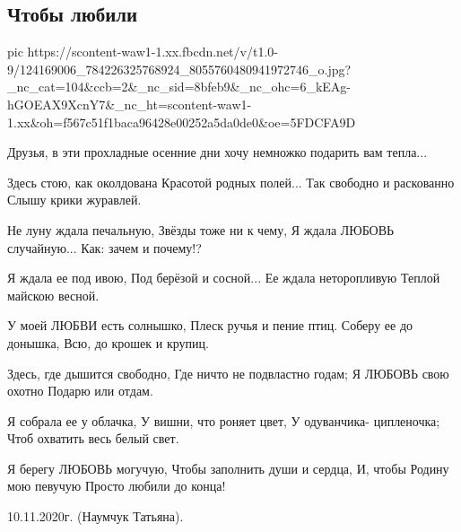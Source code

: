  
 
 

\subsection{Чтобы любили}

\ifcmt
pic https://scontent-waw1-1.xx.fbcdn.net/v/t1.0-9/124169006_784226325768924_8055760480941972746_o.jpg?_nc_cat=104&ccb=2&_nc_sid=8bfeb9&_nc_ohc=6_kEAg-hGOEAX9XcnY7&_nc_ht=scontent-waw1-1.xx&oh=f567c51f1baca96428e00252a5da0de0&oe=5FDCFA9D
\fi

Друзья, в эти прохладные осенние дни хочу немножко подарить вам тепла... 

\begin{multicols}{2}
\obeycr
Здесь стою, как околдована
Красотой родных полей...
Так свободно и раскованно
Слышу крики журавлей.

Не луну ждала печальную,
Звёзды тоже ни к чему,
Я ждала ЛЮБОВЬ случайную...
Как: зачем и почему!?

Я ждала ее под ивою,
Под берёзой и сосной...
Ее ждала неторопливую
Теплой майскою весной.

У моей ЛЮБВИ есть солнышко,
Плеск ручья и пение птиц.
Соберу ее до донышка,
Всю, до крошек и крупиц.

Здесь, где дышится свободно,
Где ничто не подвластно годам;
Я ЛЮБОВЬ свою охотно
Подарю или отдам.

Я собрала ее у облачка,
У вишни, что роняет цвет,
У одуванчика- ципленочка;
Чтоб охватить весь белый свет.

Я берегу ЛЮБОВЬ могучую,
Чтобы заполнить души и сердца,
И, чтобы Родину мою певучую
Просто любили до конца!

10.11.2020г. (Наумчук Татьяна).
\restorecr
\end{multicols}
